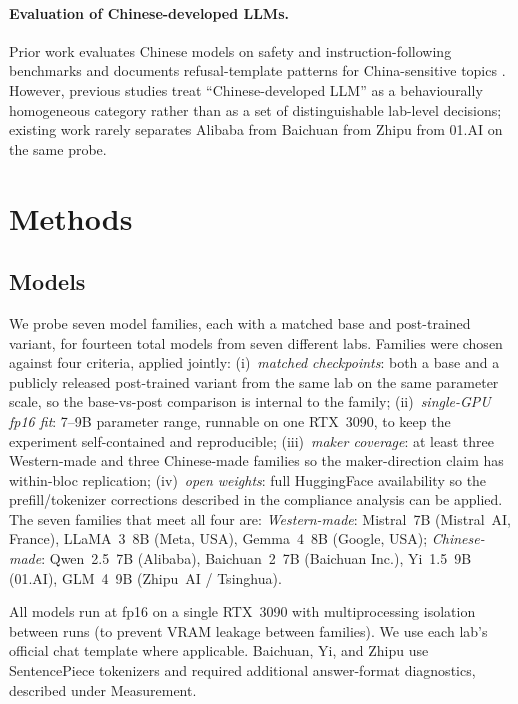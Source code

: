 \documentclass[letterpaper]{article}
\begin{document}
\paragraph{Evaluation of Chinese-developed LLMs.} Prior work evaluates Chinese models on safety and instruction-following benchmarks \citep{zhang2024safetybench,xu2023align} and documents refusal-template patterns for China-sensitive topics \citep{wang2024decodingtrust,deshpande2023toxicity}. However, previous studies treat ``Chinese-developed LLM'' as a behaviourally homogeneous category rather than as a set of distinguishable lab-level decisions; existing work rarely separates Alibaba from Baichuan from Zhipu from 01.AI on the same probe.

\section{Methods}

\subsection{Models}

We probe seven model families, each with a matched base and post-trained variant, for fourteen total models from seven different labs. Families were chosen against four criteria, applied jointly: (i)~\emph{matched checkpoints}: both a base and a publicly released post-trained variant from the same lab on the same parameter scale, so the base-vs-post comparison is internal to the family; (ii)~\emph{single-GPU fp16 fit}: 7--9B parameter range, runnable on one RTX~3090, to keep the experiment self-contained and reproducible; (iii)~\emph{maker coverage}: at least three Western-made and three Chinese-made families so the maker-direction claim has within-bloc replication; (iv)~\emph{open weights}: full HuggingFace availability so the prefill/tokenizer corrections described in the compliance analysis can be applied. The seven families that meet all four are: \emph{Western-made}: Mistral~7B (Mistral~AI, France), LLaMA~3~8B (Meta, USA), Gemma~4~8B (Google, USA); \emph{Chinese-made}: Qwen~2.5~7B (Alibaba), Baichuan~2~7B (Baichuan Inc.), Yi~1.5~9B (01.AI), GLM~4~9B (Zhipu~AI / Tsinghua).

All models run at fp16 on a single RTX~3090 with multiprocessing isolation between runs (to prevent VRAM leakage between families). We use each lab's official chat template where applicable. Baichuan, Yi, and Zhipu use SentencePiece tokenizers and required additional answer-format diagnostics, described under Measurement.
\end{document}
